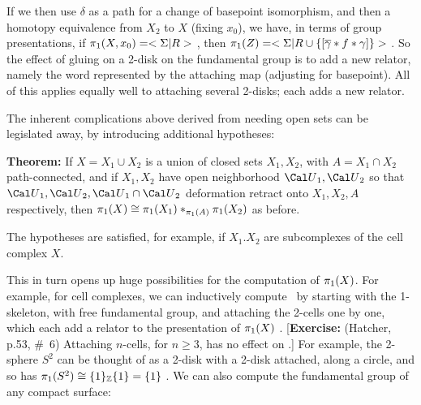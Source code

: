 
If we then use $\delta$ as a path for a change of 
basepoint isomorphism, and then a homotopy
equivalence from $X_2$ to $X$ (fixing $x_0$), we 
have, in terms of group presentations, 
if $\pi_1(X,x_0)=<\Sigma | R>$ , then $\pi_1(Z) = 
<\Sigma | R\cup\{[\overline{\gamma}*f*\gamma]\}>$ . 
So the effect of gluing on a 2-disk on the fundamental 
group is to add a new relator, 
namely the word represented by the attaching map 
(adjusting for basepoint). 
All of this applies equally well to attaching several 
2-disks; each adds a new relator. 

\msk

\leavevmode

\epsfxsize=5.4in



\bsk

The inherent complications above derived from needing open
sets can be legislated away, by introducing additional
hypotheses:

\msk

{\bf Theorem:} If $X=X_1\cup X_2$ is a union of closed
sets $X_1,X_2$, with $A=X_1\cap X_2$ path-connected, 
and if $X_1,X_2$ have open neighborhood ${\Cal U}_1,{\Cal U}_2$
so that ${\Cal U}_1,{\Cal U}_2,{\Cal U}_1\cap{\Cal U}_2$
deformation retract onto $X_1,X_2,A$ respectively, then 
$\pi_1(X)\cong \pi_1(X_1)*_{\pi_1(A)}\pi_1(X_2)$ as before.

\msk

The hypotheses are satisfied, for example, if $X_1.X_2$ are subcomplexes of the
cell complex $X$.

\msk


This in turn opens up huge possibilities for the 
computation of $\pi_1(X)$. For example, for cell complexes,
we can inductively compute \mpu\ by starting with 
the 1-skeleton, with free fundamental group, and 
attaching the 2-cells one by one, which each add 
a relator to the presentation of $\pi_1(X)$ . 
[{\bf Exercise:}
(Hatcher, p.53, \#\ 6) Attaching $n$-cells, for 
$n\geq 3$, has no effect on \mpu .] 
For example, the 2-sphere $S^2$ can be thought of as a
2-disk with a 2-disk attached, along a circle, and so has
$\pi_1(S^2)\cong \{1\}_{\Bbb Z}\{1\}=\{1\}$ . 
We can also compute the fundamental group of 
any compact surface:

\msk

